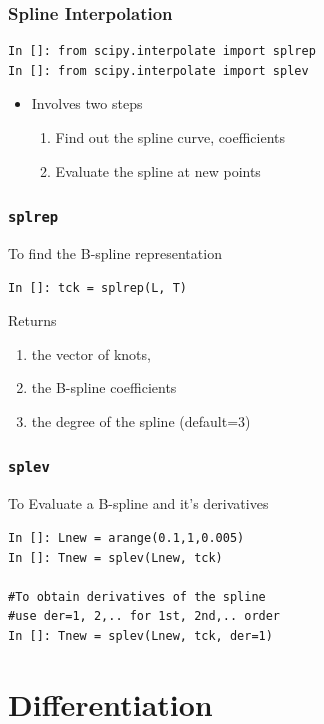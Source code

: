 \documentclass[14pt,compress]{beamer}
\newcommand{\typ}[1]{\lstinline{#1}}
\begin{document}
\begin{frame}[fragile]
\frametitle{Spline Interpolation}
\begin{small}
\begin{lstlisting}
In []: from scipy.interpolate import splrep
In []: from scipy.interpolate import splev
\end{lstlisting}
\end{small}
\begin{itemize}
\item Involves two steps
  \begin{enumerate}
  \item Find out the spline curve, coefficients
  \item Evaluate the spline at new points
  \end{enumerate}
\end{itemize}
\end{frame}

\begin{frame}[fragile]
\frametitle{\typ{splrep}}
To find the B-spline representation
\begin{lstlisting}
In []: tck = splrep(L, T)
\end{lstlisting}
Returns 
\begin{enumerate}
\item the vector of knots, 
\item the B-spline coefficients 
\item the degree of the spline (default=3)
\end{enumerate}
\end{frame}

\begin{frame}[fragile]
\frametitle{\typ{splev}}
To Evaluate a B-spline and it's derivatives
\begin{lstlisting}
In []: Lnew = arange(0.1,1,0.005)
In []: Tnew = splev(Lnew, tck)

#To obtain derivatives of the spline
#use der=1, 2,.. for 1st, 2nd,.. order
In []: Tnew = splev(Lnew, tck, der=1)
\end{lstlisting}
\end{frame}


\section{Differentiation}
\end{document}

